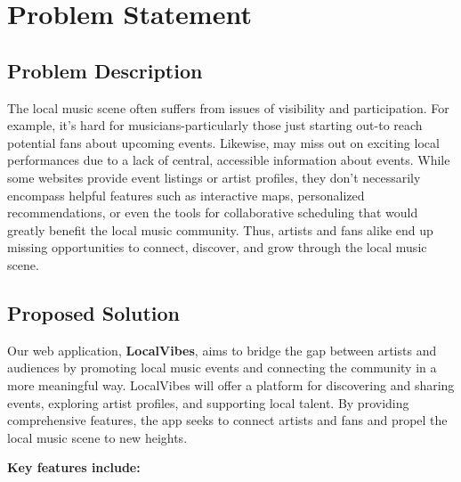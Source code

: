 \documentclass{article}
\begin{document}
\section*{Problem Statement}

\subsection*{Problem Description}

The local music scene often suffers from issues of visibility and participation. For example, it's hard for musicians-particularly those just starting out-to reach potential fans about upcoming events. Likewise, may miss out on exciting local performances due to a lack of central, accessible information about events. While some websites provide event listings or artist profiles, they don't necessarily encompass helpful features such as interactive maps, personalized recommendations, or even the tools for collaborative scheduling that would greatly benefit the local music community. Thus, artists and fans alike end up missing opportunities to connect, discover, and grow through the local music scene.

\subsection*{Proposed Solution}

Our web application, \textbf{LocalVibes}, aims to bridge the gap between artists and audiences by promoting local music events and connecting the community in a more meaningful way. LocalVibes will offer a platform for discovering and sharing events, exploring artist profiles, and supporting local talent. By providing comprehensive features, the app seeks to connect artists and fans and propel the local music scene to new heights.



\textbf{Key features include:}
\end{document}

